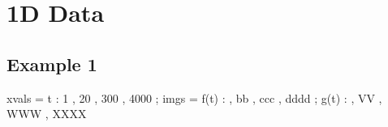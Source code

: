 \documentclass[12pt]{article}
\begin{document}


\section{1D Data}

\subsection{Example 1}

\begin{functable}
    xvals =    t : 1 , 20 , 300 , 4000 ;
    imgs  = f(t) :  , bb , ccc , dddd ;
            g(t) :  , VV , WWW , XXXX
\end{functable}


%
%
%
%
%
%
%
%
%
%
%
%
\end{document}
